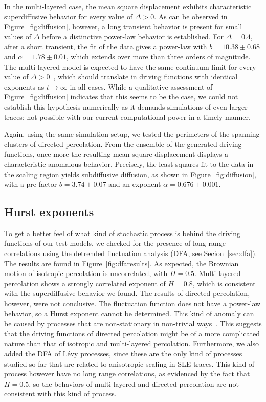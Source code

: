 In the multi-layered case, the mean square displacement exhibits characteristic
superdiffusive behavior for every value of $\Delta>0$. As can be observed in
Figure~\ref{fig:diffusion}, however, a long transient behavior is present for
small values of $\Delta$ before a distinctive power-law behavior is
established. For $\Delta=0.4$, after a short transient, the fit of the data
gives a power-law with $b=10.38\pm0.68$ and $\alpha=1.78\pm0.01$, which extends
over more than three orders of magnitude. The multi-layered model is expected
to have the same continuum limit for every value of
$\Delta>0$~\cite{Dayan1991}, which should translate in driving functions with
identical exponents as $t\rightarrow\infty$ in all cases. While a qualitative
assessment of Figure~\ref{fig:diffusion} indicates that this seems to be the
case, we could not establish this hypothesis numerically as it demands
simulations of even larger traces; not possible with our current computational
power in a timely manner. 



Again, using the same simulation setup, we tested the perimeters of the spanning
clusters of directed percolation. From the ensemble of the generated driving
functions, once more the resulting mean square displacement displays a
characteristic anomalous behavior. Precisely, the least-squares fit to the data
in the scaling region yields subdiffusive diffusion, as shown in
Figure~\ref{fig:diffusion}, with a pre-factor $b=3.74\pm0.07$ and an exponent
$\alpha=0.676\pm0.001$.

\subsection{Hurst exponents}
\label{sec:hurst}

To get a better feel of what kind of stochastic process is behind the driving
functions of our test models, we checked for the presence of long range
correlations using the detrended fluctuation analysis (DFA, see
Secion~\ref{sec:dfa}). The results are found in Figure~\ref{fig:dfaresults}. As
expected, the Brownian motion of isotropic percolation is uncorrelated, with
$H=0.5$. Multi-layered percolation shows a strongly correlated exponent of
$H=0.8$, which is consistent with the superdiffusive behavior we found. The
results of directed percolation, however, were not conclusive. The fluctuation
function does not have a power-law behavior, so a Hurst exponent cannot be
determined. This kind of anomaly can be caused by processes that are
non-stationary in non-trivial ways~\cite{Hu2001, Chen2002}. This suggests that
the driving functions of directed percolation might be of a more complicated
nature than that of isotropic and multi-layered percolation. Furthermore, we
also added the DFA of Lévy processes, since these are the only kind of
processes studied so far that are related to anisotropic scaling in SLE traces.
This kind of process however have no long range correlations, as evidenced by
the fact that $H=0.5$, so the behaviors of multi-layered and directed
percolation are not consistent with this kind of process.
\clearpage

